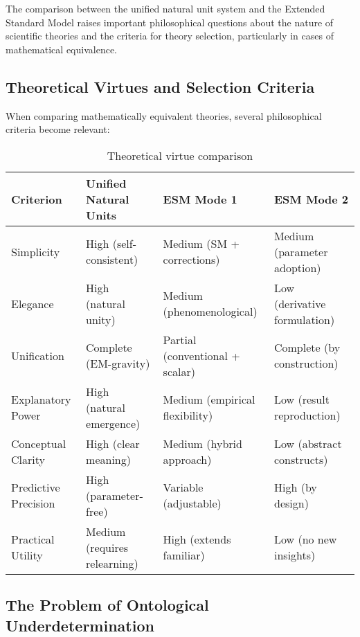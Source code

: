 \documentclass[12pt,a4paper]{article}
\begin{document}
	The comparison between the unified natural unit system and the Extended Standard Model raises important philosophical questions about the nature of scientific theories and the criteria for theory selection, particularly in cases of mathematical equivalence.
	
	\subsection{Theoretical Virtues and Selection Criteria}
	\label{subsec:theoretical_virtues}
	
	When comparing mathematically equivalent theories, several philosophical criteria become relevant:
	
	\begin{table}[ht]
		\centering
		\caption{Theoretical virtue comparison}
		\label{tab:theoretical_virtues}
		\begin{tabular}{p{}|p{}|p{}|p{}}
			\hline
			\textbf{Criterion} & \textbf{Unified Natural Units} & \textbf{ESM Mode 1} & \textbf{ESM Mode 2} \\
			\hline
			Simplicity & High (self-consistent) & Medium (SM + corrections) & Medium (parameter adoption) \\
			\hline
			Elegance & High (natural unity) & Medium (phenomenological) & Low (derivative formulation) \\
			\hline
			Unification & Complete (EM-gravity) & Partial (conventional + scalar) & Complete (by construction) \\
			\hline
			Explanatory Power & High (natural emergence) & Medium (empirical flexibility) & Low (result reproduction) \\
			\hline
			Conceptual Clarity & High (clear meaning) & Medium (hybrid approach) & Low (abstract constructs) \\
			\hline
			Predictive Precision & High (parameter-free) & Variable (adjustable) & High (by design) \\
			\hline
			Practical Utility & Medium (requires relearning) & High (extends familiar) & Low (no new insights) \\
			\hline
		\end{tabular}
	\end{table}
	
	\subsection{The Problem of Ontological Underdetermination}
	\label{subsec:ontological_underdetermination}
	
\end{document}
